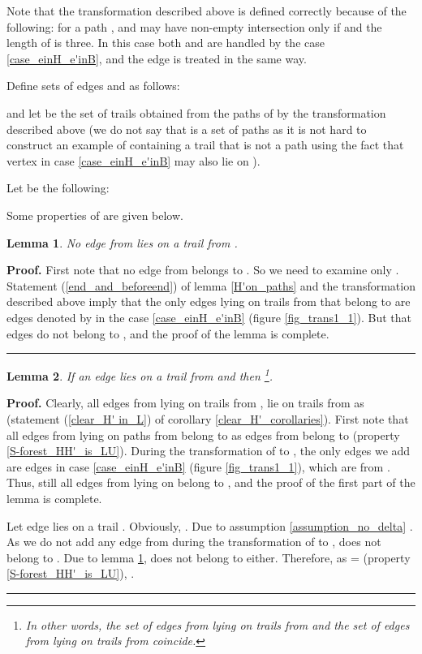 \documentclass[a4paper, 12pt]{article}
\newtheorem{lemma}{Lemma}[subsection]
\newenvironment{proof}[1][Proof]{\noindent\textbf{#1.} }{\ \rule{0.5em}{0.5em}}
\begin{document}
Note that the transformation described above is defined correctly
because of the following: for a path ,  and
 may have non-empty intersection only if  and the length of  is three. In this case both
 and  are handled by the case
\ref{case_einH_e'inB}, and the edge 
is treated in the same way.

Define sets of edges  and  as follows:


and let  be the set of trails obtained from the paths of
 by the transformation described above (we do not say that
 is a set of paths as it is not hard to construct an example of
 containing a trail that is not a path using the fact that vertex
 in case \ref{case_einH_e'inB} may also lie on ).

Let  be the following:


\bigskip

Some properties of  are given below.

\begin{lemma} \label{S_cap_H'_is_empty}
No edge from  lies on a trail from .
\end{lemma}
\begin{proof}
First note that no edge from  belongs to . So
we need to examine only . Statement (\ref{end_and_beforeend}) of
lemma \ref{H'on_paths} and the transformation described above imply
that the only edges lying on trails from  that belong to  are
edges denoted by  in the case \ref{case_einH_e'inB} (figure
\ref{fig_trans1_1}). But that edges do not belong to , and the
proof of the lemma is complete.
\end{proof}

\begin{lemma} \label{S_and_B_are_the_same}
If an edge  lies on a trail from   and 
then  \footnote{In other words, the set of
edges from  lying on trails from  and the set of edges
from  lying on trails from  coincide.}.
\end{lemma}
\begin{proof}
Clearly, all edges from  lying on trails from , lie on
trails from  as  (statement
(\ref{clear_H' in_L}) of corollary \ref{clear_H'_corollaries}).
First note that all edges from  lying on paths from
 belong to  as edges from  belong to 
(property \ref{S-forest_HH'_is_LU}). During the transformation of
 to , the only edges we add are edges  in case
\ref{case_einH_e'inB} (figure \ref{fig_trans1_1}), which are from
. Thus, still all edges from  lying on  belong to
, and the proof of the first part of the lemma is complete.

Let edge  lies on a trail . Obviously, .
Due to assumption \ref{assumption_no_delta} . As we do not add any edge from  during
the transformation of  to ,  does not belong to .
Due to lemma \ref{S_cap_H'_is_empty},  does not belong to 
either. Therefore, as  =  (property
\ref{S-forest_HH'_is_LU}), .
\end{proof}
\end{document}
